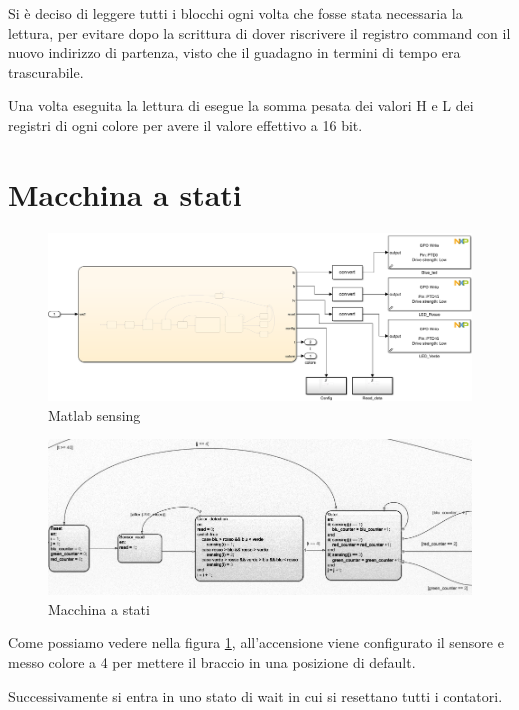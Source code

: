 \documentclass[12pt]{report}
\begin{document}
Si è deciso di leggere tutti i blocchi ogni volta che fosse stata necessaria la lettura, per evitare dopo la scrittura di dover riscrivere il registro command con il nuovo indirizzo di partenza, visto che il guadagno in termini di tempo era trascurabile.

Una volta eseguita la lettura di esegue la somma pesata dei valori H e L dei registri di ogni colore per avere il valore effettivo a 16 bit.

\section{Macchina a stati}
\begin{figure}

    \includegraphics[width=\textwidth]{Immagini_sensore/Sensing_e_macchina_a_stati.png}
    \caption{Matlab sensing}
    \end{figure}
    
\begin{figure}
    \includegraphics[width=\textwidth]{Immagini_sensore/sensor_chart.png}
    \caption{Macchina a stati}
    \label{fig:stateflow}
\end{figure}

Come possiamo vedere nella figura \ref{fig:stateflow}, all'accensione viene configurato il sensore e messo colore a 4 per mettere il braccio in una posizione di default.

Successivamente si entra in uno stato di wait in cui si resettano tutti i contatori.
\end{document}

